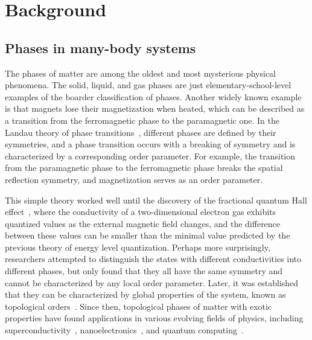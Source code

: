 \chapter{Background}

\section{Phases in many-body systems}

The phases of matter are among the oldest and most mysterious physical phenomena. The solid, liquid, and gas phases are just elementary-school-level examples of the boarder classification of phases. Another widely known example is that magnets lose their magnetization when heated, which can be described as a transition from the ferromagnetic phase to the paramagnetic one. In the Landau theory of phase transitions~\cite{landau1937theory}, different phases are defined by their symmetries, and a phase transition occurs with a breaking of symmetry and is characterized by a corresponding order parameter. For example, the transition from the paramagnetic phase to the ferromagnetic phase breaks the spatial reflection symmetry, and magnetization serves as an order parameter.

This simple theory worked well until the discovery of the fractional quantum Hall effect~\cite{tsui1982two}, where the conductivity of a two-dimensional electron gas exhibits quantized values as the external magnetic field changes, and the difference between these values can be smaller than the minimal value predicted by the previous theory of energy level quantization. Perhaps more surprisingly, researchers attempted to distinguish the states with different conductivities into different phases, but only found that they all have the same symmetry and cannot be characterized by any local order parameter. Later, it was established that they can be characterized by global properties of the system, known as topological orders~\cite{wen1990ground}. Since then, topological phases of matter with exotic properties have found applications in various evolving fields of physics, including superconductivity~\cite{hansson2004superconductors}, nanoelectronics~\cite{gilbert2021topological}, and quantum computing~\cite{kitaev2003fault}.

